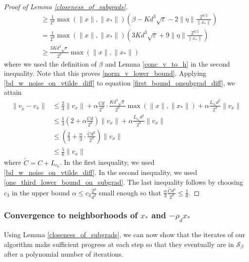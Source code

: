 \documentclass[11pt]{article}
\renewcommand{\epsilon}{\varepsilon}
\newcommand{\al}{\alpha}
\newcommand{\Seps}{\mathcal{S}}
\theoremstyle{remark}
\begin{document}
\begin{proof}[Proof of Lemma \ref{closeness_of_subgrads}]
\begin{align}
    & \geqslant \frac{1}{2^d}\max(\|x\|,\|x_*\|)\left(\beta - Kd^3\sqrt{\epsilon} - 2\|\eta\|\frac{2^{d/2}}{\|x_*\|}\right) \nonumber\\
    & = \frac{1}{2^d}\max(\|x\|,\|x_*\|)\left(3Kd^3\sqrt{\epsilon} + 9\|\eta\|\frac{2^{d/2}}{\|x_*\|}\right) \label{bd_w_noise_on_vtilde_diff}\\
    & \geqslant \frac{3Kd^3\sqrt{\epsilon}}{2^d}\max(\|x\|,\|x_*\|) \label{one_third_lower_bound_on_subgrad}
\end{align} where we used the definition of $\beta$ and Lemma \ref{conc_v_to_h} in the second inequality. Note that this proves \eqref{norm_v_lower_bound}. Applying \eqref{bd_w_noise_on_vtilde_diff} to equation \eqref{first_bound_onsubgrad_diff}, we attain \begin{align*}
    \|v_{\tilde{x}} - v_{x}\| & \leqslant \frac{2}{3}\|v_x\| +  \al\frac{Cd}{2^d}\cdot\frac{Kd^3\sqrt{\epsilon}}{2^d}\max(\|x\|,\|x_*\|) + \al \frac{L_{c_0} d^2}{2^d}\|v_{x}\| \\
    & \leqslant \frac{1}{3}\left(2 + \al \frac{Cd}{2^d}\right)\|v_{x}\| + \al \frac{L_{c_0} d^2}{2^d}\|v_{x}\| \\
    & \leqslant \left(\frac{2}{3} +  \frac{\al}{3}\cdot\frac{\tilde{C}d^2}{2^d}\right)\|v_{x}\| \\
    & \leqslant \frac{5}{6}\|v_{x}\|
\end{align*} where $\tilde{C} = C + L_{c_0}$. In the first inequality, we used \eqref{bd_w_noise_on_vtilde_diff}. In the second inequality, we used \eqref{one_third_lower_bound_on_subgrad}. The last inequality follows by choosing $c_3$ in the upper bound $\al \leqslant c_3\frac{2^d}{d^2}$ small enough so that $\frac{\al}{3}\frac{\tilde{C}d^2}{2^d} \leqslant \frac{1}{6}$. 
    
\end{proof}

\subsubsection{Convergence to neighborhoods of $x_*$ and $-\rho_d x_*$} \label{conv_proof_first_subsection}

Using Lemma \ref{closeness_of_subgrads}, we can now show that the iterates of our algorithm make sufficient progress at each step so that they eventually are in $\Seps_{\beta}$ after a polynomial number of iterations.
\end{document}
